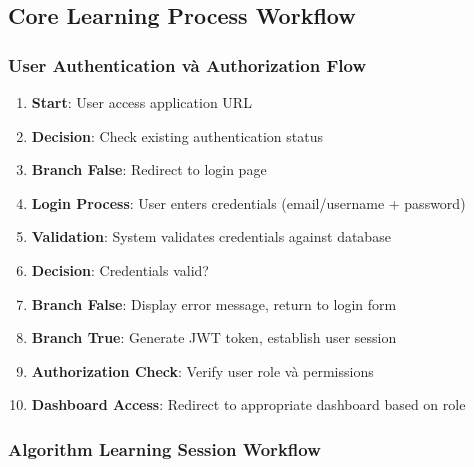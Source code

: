\subsection{Core Learning Process Workflow}
\label{subsec:learning-workflow}

\subsubsection{User Authentication và Authorization Flow}

\begin{enumerate}
    \item \textbf{Start}: User access application URL
    \item \textbf{Decision}: Check existing authentication status
    \item \textbf{Branch False}: Redirect to login page
    \item \textbf{Login Process}: User enters credentials (email/username + password)
    \item \textbf{Validation}: System validates credentials against database
    \item \textbf{Decision}: Credentials valid?
    \item \textbf{Branch False}: Display error message, return to login form
    \item \textbf{Branch True}: Generate JWT token, establish user session
    \item \textbf{Authorization Check}: Verify user role và permissions
    \item \textbf{Dashboard Access}: Redirect to appropriate dashboard based on role
\end{enumerate}

\subsubsection{Algorithm Learning Session Workflow}

